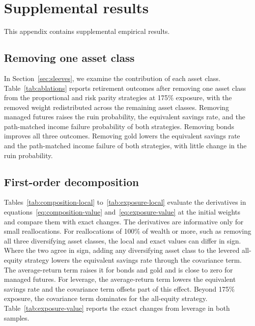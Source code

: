 \clearpage
\section{Supplemental results}
\label{app:supplemental}

This appendix contains supplemental empirical results.

\subsection{Removing one asset class}
\label{app:ablations}

In Section~\ref{sec:sleeves}, we examine the contribution of each asset class. Table~\ref{tab:ablations}
reports retirement outcomes after removing one asset class from the proportional and risk parity
strategies at 175\% exposure, with the removed weight redistributed across the remaining asset classes.
Removing managed futures raises the ruin probability, the equivalent savings rate, and the path-matched income
failure probability of both strategies. Removing bonds improves all three outcomes. Removing gold lowers
the equivalent savings rate and the path-matched income failure of both strategies, with little
change in the ruin probability.



\subsection{First-order decomposition}
\label{app:local-decomposition}

Tables~\ref{tab:composition-local} to~\ref{tab:exposure-local} evaluate the derivatives in
equations~\eqref{eq:composition-value} and~\eqref{eq:exposure-value} at the initial weights and compare
them with exact changes. The derivatives are informative only for small reallocations. For reallocations
of 100\% of wealth or more, such as removing all three diversifying asset classes, the local and exact
values can differ in sign. Where the two agree in sign, adding any diversifying asset class to the levered
all-equity strategy lowers the equivalent savings rate through the covariance term. The average-return
term raises it for bonds and gold and is close to zero for managed futures. For leverage, the
average-return term lowers the equivalent savings rate and the covariance term offsets part of this
effect. Beyond 175\% exposure, the covariance term dominates for the all-equity strategy.
Table~\ref{tab:exposure-value} reports the exact changes from leverage in both samples.

